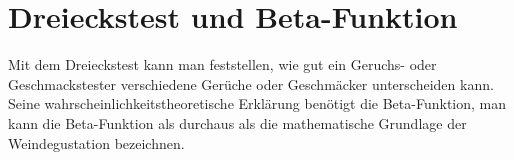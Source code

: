%
%
%
\chapter{Dreieckstest und Beta-Funktion\label{chapter:dreieck}}
\begin{refsection}

\noindent
Mit dem Dreieckstest kann man feststellen, wie gut ein Geruchs-
oder Geschmackstester verschiedene Gerüche oder Geschmäcker
unterscheiden kann.
Seine wahrscheinlichkeitstheoretische Erklärung benötigt die Beta-Funktion,
man kann die Beta-Funktion als durchaus als die mathematische Grundlage
der Weindegustation
bezeichnen.






\printbibliography[heading=subbibliography]
\end{refsection}
